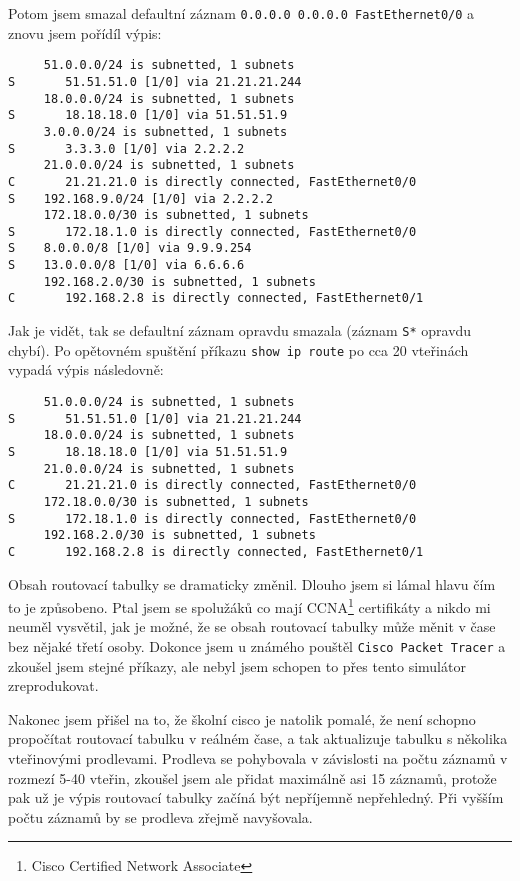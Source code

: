 Potom jsem smazal defaultní záznam \verb|0.0.0.0 0.0.0.0 FastEthernet0/0| a znovu jsem pořídíl výpis:
\begin{verbatim}
     51.0.0.0/24 is subnetted, 1 subnets
S       51.51.51.0 [1/0] via 21.21.21.244
     18.0.0.0/24 is subnetted, 1 subnets
S       18.18.18.0 [1/0] via 51.51.51.9
     3.0.0.0/24 is subnetted, 1 subnets
S       3.3.3.0 [1/0] via 2.2.2.2
     21.0.0.0/24 is subnetted, 1 subnets
C       21.21.21.0 is directly connected, FastEthernet0/0
S    192.168.9.0/24 [1/0] via 2.2.2.2
     172.18.0.0/30 is subnetted, 1 subnets
S       172.18.1.0 is directly connected, FastEthernet0/0
S    8.0.0.0/8 [1/0] via 9.9.9.254
S    13.0.0.0/8 [1/0] via 6.6.6.6
     192.168.2.0/30 is subnetted, 1 subnets
C       192.168.2.8 is directly connected, FastEthernet0/1
\end{verbatim} 
Jak je vidět, tak se defaultní záznam opravdu smazala (záznam \verb|S*| opravdu chybí). Po opětovném spuštění příkazu \verb|show ip route| po cca 20 vteřinách vypadá výpis následovně:
\begin{verbatim}
     51.0.0.0/24 is subnetted, 1 subnets
S       51.51.51.0 [1/0] via 21.21.21.244
     18.0.0.0/24 is subnetted, 1 subnets
S       18.18.18.0 [1/0] via 51.51.51.9
     21.0.0.0/24 is subnetted, 1 subnets
C       21.21.21.0 is directly connected, FastEthernet0/0
     172.18.0.0/30 is subnetted, 1 subnets
S       172.18.1.0 is directly connected, FastEthernet0/0
     192.168.2.0/30 is subnetted, 1 subnets
C       192.168.2.8 is directly connected, FastEthernet0/1
\end{verbatim} 

Obsah routovací tabulky se dramaticky změnil. Dlouho jsem si lámal hlavu čím to je způsobeno. Ptal jsem se spolužáků co mají CCNA\footnote{Cisco Certified Network Associate} certifikáty a nikdo mi neuměl vysvětil, jak je možné, že se obsah routovací tabulky může měnit v čase bez nějaké třetí osoby. Dokonce jsem u známého pouštěl \verb|Cisco Packet Tracer| a zkoušel jsem stejné příkazy, ale nebyl jsem schopen to přes tento simulátor zreprodukovat.

Nakonec jsem přišel na to, že školní cisco je natolik pomalé, že není schopno propočítat routovací tabulku v reálném čase, a tak aktualizuje tabulku s několika vteřinovými prodlevami. Prodleva se pohybovala v závislosti na počtu záznamů v rozmezí 5-40 vteřin, zkoušel jsem ale přidat maximálně asi 15 záznamů, protože pak už je výpis routovací tabulky začíná být nepříjemně nepřehledný. Při vyšším počtu záznamů by se prodleva zřejmě navyšovala. 

